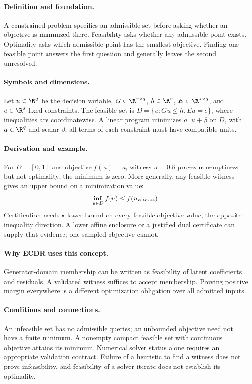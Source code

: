 \paragraph{Definition and foundation.}
A constrained problem specifies an admissible set before asking whether an objective is minimized there. Feasibility asks whether any admissible point exists. Optimality asks which admissible point has the smallest objective. Finding one feasible point answers the first question and generally leaves the second unresolved.
\paragraph{Symbols and dimensions.}
Let $u\in\R^q$ be the decision variable, $G\in\R^{r\times q}$, $h\in\R^r$, $E\in\R^{s\times q}$, and $e\in\R^s$ fixed constraints. The feasible set is $D=\{u:Gu\le h,Eu=e\}$, where inequalities are coordinatewise. A linear program minimizes $a^\top u+\beta$ on $D$, with $a\in\R^q$ and scalar $\beta$; all terms of each constraint must have compatible units.
\paragraph{Derivation and example.}
For $D=[0,1]$ and objective $f(u)=u$, witness $u=0.8$ proves nonemptiness but not optimality; the minimum is zero. More generally, any feasible witness gives an upper bound on a minimization value:
\[
 \inf_{u\in D}f(u)\le f(u_{\rm witness}).
\]
Certification needs a lower bound on every feasible objective value, the opposite inequality direction. A lower affine enclosure or a justified dual certificate can supply that evidence; one sampled objective cannot.
\paragraph{Why ECDR uses this concept.}
Generator-domain membership can be written as feasibility of latent coefficients and residuals. A validated witness suffices to accept membership. Proving positive margin everywhere is a different optimization obligation over all admitted inputs.
\paragraph{Conditions and connections.}
An infeasible set has no admissible queries; an unbounded objective need not have a finite minimum. A nonempty compact feasible set with continuous objective attains its minimum. Numerical solver status alone requires an appropriate validation contract. Failure of a heuristic to find a witness does not prove infeasibility, and feasibility of a solver iterate does not establish its optimality.

